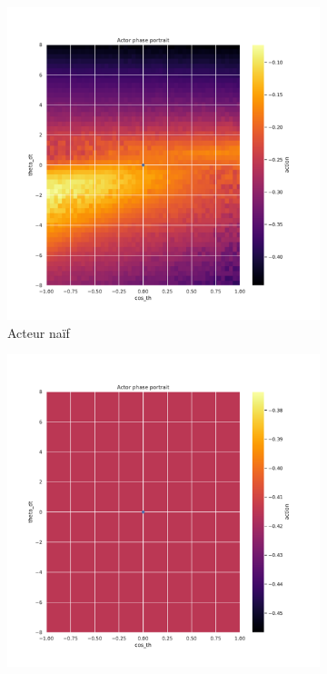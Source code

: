 \begin{figure}[H]
    \centering
    \begin{subfigure}{0.3\textwidth}
        \includegraphics[width=\textwidth]{figures/iteration4/0_actor_discount__ante_Pendulum-v0.pdf}
        \caption{Acteur naïf}
    \end{subfigure}
    \begin{subfigure}{0.3\textwidth}
        \includegraphics[width=\textwidth]{figures/iteration4/0_actor_discount__post_Pendulum-v0.pdf}

\end{subfigure}
\end{figure}
